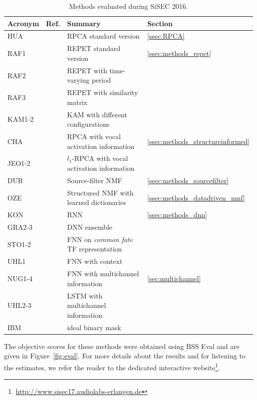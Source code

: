 \begin{table}[htbp]
	\centering
	\caption{Methods evaluated during SiSEC 2016.}
	\label{tab:systems}
	\begin{tabular}{|lll@{}l@{}|}
		\hline
		\textbf{Acronym} & \textbf{Ref.} & \textbf{Summary} & \textbf{Section}\\
		\hline
		HUA & \cite{huang12} & RPCA standard version & \ref{ssec:RPCA}\\
		\hline
		RAF1 & \cite{rafii13} & REPET standard version & \ref{ssec:methods_repet}\\
		RAF2 & \cite{liutkus12} & REPET with time-varying period & \\
		RAF3 & \cite{rafii12} & REPET with similarity matrix & \\
		KAM1-2 & \cite{liutkus15} & KAM with different configurations &\\
		\hline
		CHA & \cite{chan15} & RPCA with vocal activation information &\ref{ssec:methods_structureinformed}\\
		JEO1-2 & \cite{jeong17} &  $l_1$-RPCA with vocal activation information &\\
		\hline
		DUR & \cite{durrieu11} & Source-filter NMF &\ref{ssec:methods_sourcefilter}\\
		\hline
		OZE & \cite{salaun14} & Structured NMF with learned dictionaries & \ref{ssec:methods_datadriven_nmf}\\
		\hline
		KON & \cite{huang15} & RNN & \ref{ssec:methods_dnn} \\
		GRA2-3 & \cite{grais16} & DNN ensemble &\\
		STO1-2 & \cite{stoter16} & FNN on \textit{common fate} TF representation&\\
		UHL1 & \cite{Uhlich15} & FNN with context&\\
		\hline
		NUG1-4 & \cite{nugraha16} & FNN with multichannel information &\ref{sec:multichannel}\\
		UHL2-3 & \cite{uhlich17} & LSTM with multichannel information &\\
		\hline
		IBM & & ideal binary mask &  \\
		\hline
	\end{tabular}
\end{table}

The objective scores for these methods were obtained using BSS Eval and are given in Figure~\ref{fig:eval}. For more details about the results and for listening to the estimates, we refer the reader to the dedicated interactive website\footnote{\url{http://www.sisec17.audiolabs-erlangen.de}}.

